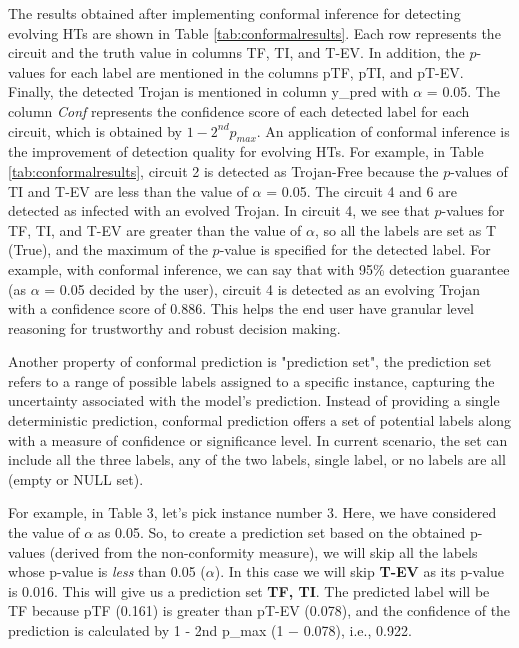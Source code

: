 The results obtained after implementing conformal inference for detecting evolving HTs are shown in Table \ref{tab:conformalresults}. Each row represents the circuit and the truth value in columns TF, TI, and T-EV. In addition, the $p$-values for each label are mentioned in the columns pTF, pTI, and pT-EV. Finally, the detected Trojan is mentioned in column y\_pred with $\alpha$ = 0.05. The column \textit{Conf} represents the confidence score of each detected label for each circuit, which is obtained by $1 - 2^{nd}p_{max}$. An application of conformal inference is the improvement of detection quality for evolving HTs. For example, in Table \ref{tab:conformalresults}, circuit 2 is detected as Trojan-Free because the $p$-values of TI and T-EV are less than the value of $\alpha$ = 0.05. The circuit 4 and 6 are detected as infected with an evolved Trojan. In circuit 4, we see that $p$-values for TF, TI, and T-EV are greater than the value of $\alpha$, so all the labels are set as T (True), and the maximum of the $p$-value is specified for the detected label. For example, with conformal inference, we can say that with 95\% detection guarantee (as $\alpha$ = 0.05 decided by the user), circuit 4 is detected as an evolving Trojan with a confidence score of 0.886. This helps the end user have granular level reasoning for trustworthy and robust decision making.

Another property of conformal prediction is "prediction set", the prediction set refers to a range of possible labels assigned to a specific instance, capturing the uncertainty associated with the model's prediction. Instead of providing a single deterministic prediction, conformal prediction offers a set of potential labels along with a measure of confidence or significance level. In current scenario, the set can include all the three labels, any of the two labels, single label, or no labels are all (empty or NULL set). 

For example, in Table 3, let's pick instance number 3. Here, we have considered the value of $\alpha$ as 0.05. So, to create a prediction set based on the obtained p-values (derived from the non-conformity measure), we will skip all the labels whose p-value is \textit{less} than 0.05 ($\alpha$). In this case we will skip \textbf{T-EV} as its p-value is 0.016. This will give us a prediction set \textbf{{TF, TI}}. The predicted label will be TF because pTF (0.161) is greater than pT-EV (0.078), and the confidence of the prediction is calculated by 1 - 2nd p\_max (1 − 0.078), i.e., 0.922.

